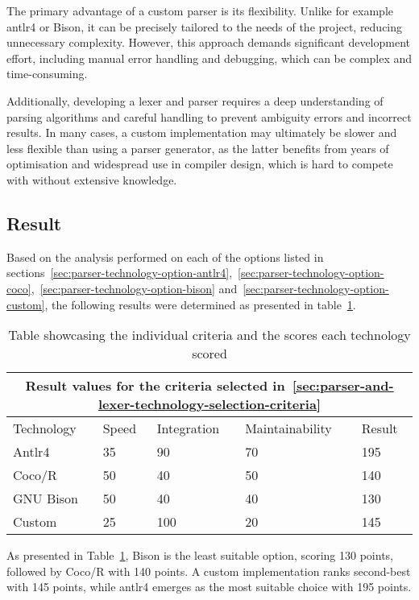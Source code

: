 The primary advantage of a custom parser is its flexibility. Unlike for example \Gls{antlr4} or Bison, it can be precisely tailored to the needs of the project, reducing unnecessary complexity. However, this approach demands significant development effort, including manual error handling and debugging, which can be complex and time-consuming.

Additionally, developing a lexer and parser requires a deep understanding of parsing algorithms and careful handling to prevent ambiguity errors and incorrect results. In many cases, a custom implementation may ultimately be slower and less flexible than using a parser generator, as the latter benefits from years of optimisation and widespread use in compiler design, which is hard to compete with without extensive knowledge.

\subsection{Result}

Based on the analysis performed on each of the options listed in sections~\ref{sec:parser-technology-option-antlr4},~\ref{sec:parser-technology-option-coco},~\ref{sec:parser-technology-option-bison} and~\ref{sec:parser-technology-option-custom}, the following results were determined as presented in table~\ref{tab:parser-and-lexer-technology-results}.

\begin{table}[H]
	\centering
	\begin{tabular}{ |p{3.2cm}|p{2.8cm}|p{2.8cm}|p{2.8cm}|p{1.6cm}|  }
		\hline
		\multicolumn{5}{|c|}{Result values for the criteria selected in~\ref{sec:parser-and-lexer-technology-selection-criteria}} \\
		\hline
		Technology&Speed&Integration&Maintainability&Result\\
		\hline
		Antlr4&35&90&70&195\\
		Coco/R&50&40&50&140\\
		GNU Bison&50&40&40&130\\
		Custom&25&100&20&145\\
		\hline
	\end{tabular}
	\caption{Table showcasing the individual criteria and the scores each technology scored}
	\label{tab:parser-and-lexer-technology-results}
\end{table}

As presented in Table~\ref{tab:parser-and-lexer-technology-results}, Bison is the least suitable option, scoring 130 points, followed by Coco/R with 140 points. A custom implementation ranks second-best with 145 points, while \Gls{antlr4} emerges as the most suitable choice with 195 points.

